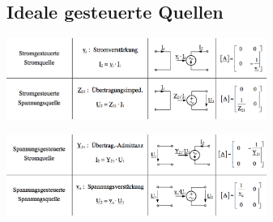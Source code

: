 \subsection{Ideale gesteuerte Quellen}
	\begin{minipage}{9cm}
		\includegraphics[width = 8.5cm]{./bilder/ideal_stromgesteuerte_quellen}
	\end{minipage}
	\begin{minipage}{9cm}
		\includegraphics[width = 8.5cm]{./bilder/ideal_spannungsgesteuerte_quellen}
	\end{minipage}
	
